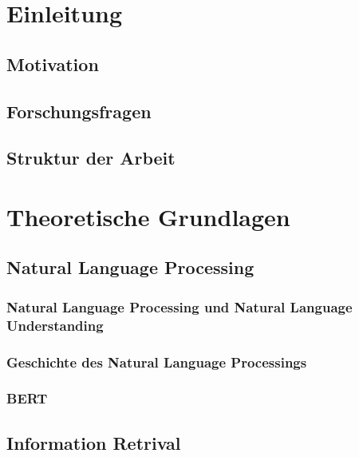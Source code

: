 \documentclass[
        ngerman,
        paper=a4,
        numbers=noendperiod,
]{scrreprt}
\begin{document}
\chapter{Einleitung}
\section{Motivation}
\section{Forschungsfragen}
\section{Struktur der Arbeit}

\chapter{Theoretische Grundlagen}



\section{Natural Language Processing}
\subsection{Natural Language Processing und Natural Language Understanding}
\subsection{Geschichte des Natural Language Processings}
\subsection{BERT}

\section{Information Retrival}
\end{document}
